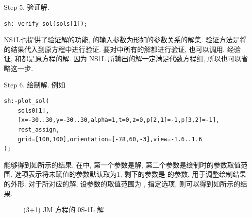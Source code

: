 Step 5. 验证解.
\begin{verbatim}
sh:-verify_sol(sols[1]);
\end{verbatim}
NS1L也提供了验证解的功能, 的输入参数为形如的参数关系的解集. 验证方法是将的结果代入到原方程中进行验证. 要对中所有的解都进行验证, 也可以调用. 经验证, 和都是原方程的解. 因为 NS1L 所输出的解一定满足代数方程组, 所以也可以省略这一步.

Step 6. 绘制解. 例如
\begin{verbatim}
sh:-plot_sol(
    sols0[1],
    [x=-30..30,y=-30..30,alpha=1,t=0,z=0,p[2,1]=-1,p[3,2]=-1],
    rest_assign,
    grid=[100,100],orientation=[-78,60,-3],view=-1.6..1.6
);
\end{verbatim}
能够得到如所示的结果. 在中, 第一个参数是解, 第二个参数是绘制时的参数取值范围, 选项表示将未赋值的参数默认取为1, 剩下的参数是  的参数, 用于调整绘制结果的外形. 对于所对应的解, 设参数的取值范围为 \cd{[x=-30..30,y=-30..30,alpha=1,t=0,z=0]}, 指定选项, 则可以得到如所示的结果.

\begin{figure}[htbp]
\centering
{}
\caption{(3+1) JM 方程的 0S-1L 解}
\end{figure}

